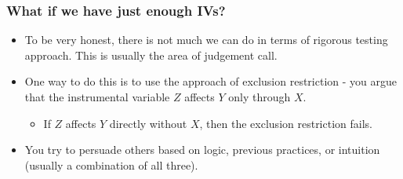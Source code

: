 \documentclass[aspectratio=169]{beamer}
\begin{document}
\begin{frame}
\frametitle{What if we have just enough IVs?}
\begin{itemize}
\item To be very honest, there is not much we can do in terms of rigorous testing approach. This is usually the area of judgement call. 
\item One way to do this is to use the approach of exclusion restriction - you argue that the instrumental variable $Z$ affects $Y$ only through $X$. 
\begin{itemize}
\item If $Z$ affects $Y$ directly without $X$, then the exclusion restriction fails. 
\end{itemize}
\item You try to persuade others based on logic, previous practices, or intuition (usually a combination of all three). 
\end{itemize}
\end{frame}


\end{document}
